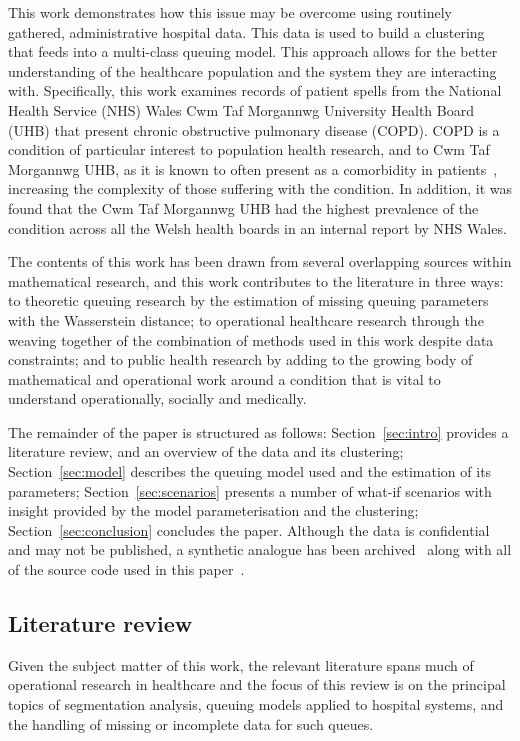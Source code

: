 \documentclass[11pt]{article}
\begin{document}
This work demonstrates how this issue may be overcome using routinely gathered,
administrative hospital data. This data is used to build a clustering that feeds
into a multi-class queuing model. This approach allows for the better
understanding of the healthcare population and the system they are interacting
with.  Specifically, this work examines records of patient spells from the
National Health Service (NHS) Wales Cwm Taf Morgannwg University Health Board
(UHB) that present chronic obstructive pulmonary disease (COPD). COPD is a
condition of particular interest to population health research, and to Cwm Taf
Morgannwg UHB, as it is known to often present as a comorbidity in
patients~\cite{Houben2019}, increasing the complexity of those suffering with
the condition. In addition, it was found that the Cwm Taf Morgannwg UHB had the
highest prevalence of the condition across all the Welsh health boards in an
internal report by NHS Wales.

The contents of this work has been drawn from several overlapping sources within
mathematical research, and this work contributes to the literature in three
ways: to theoretic queuing research by the estimation of missing queuing
parameters with the Wasserstein distance; to operational healthcare research
through the weaving together of the combination of methods used in this work
despite data constraints; and to public health research by adding to the growing
body of mathematical and operational work around a condition that is vital to
understand operationally, socially and medically.

The remainder of the paper is structured as follows: Section~\ref{sec:intro}
provides a literature review, and an overview of the data and its clustering;
Section~\ref{sec:model} describes the queuing model used and the estimation of
its parameters; Section~\ref{sec:scenarios} presents a number of what-if
scenarios with insight provided by the model parameterisation and the
clustering; Section~\ref{sec:conclusion} concludes the paper. Although the data
is confidential and may not be published, a synthetic analogue has been
archived~\cite{Wilde2020synthetic} along with all of the source code used in
this paper~\cite{Wilde2020github}.


\subsection{Literature review}\label{subsec:review}

Given the subject matter of this work, the relevant literature spans much of
operational research in healthcare and the focus of this review is on the
principal topics of segmentation analysis, queuing models applied to hospital
systems, and the handling of missing or incomplete data for such queues.
\end{document}
